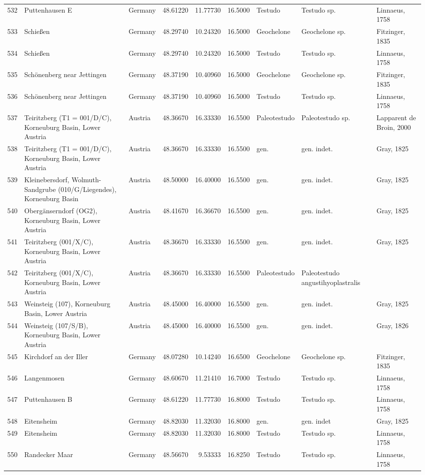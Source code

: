 \begin{landscape}
{\begin{longtable}[]{@{}lllrrrlll@{}}
532 & Puttenhausen E & Germany & 48.61220 & 11.77730 & 16.5000 & Testudo
& Testudo sp. & Linnaeus, 1758\tabularnewline
533 & Schießen & Germany & 48.29740 & 10.24320 & 16.5000 & Geochelone &
Geochelone sp. & Fitzinger, 1835\tabularnewline
534 & Schießen & Germany & 48.29740 & 10.24320 & 16.5000 & Testudo &
Testudo sp. & Linnaeus, 1758\tabularnewline
535 & Schönenberg near Jettingen & Germany & 48.37190 & 10.40960 &
16.5000 & Geochelone & Geochelone sp. & Fitzinger, 1835\tabularnewline
536 & Schönenberg near Jettingen & Germany & 48.37190 & 10.40960 &
16.5000 & Testudo & Testudo sp. & Linnaeus, 1758\tabularnewline
537 & Teiritzberg (T1 = 001/D/C), Korneuburg Basin, Lower Austria &
Austria & 48.36670 & 16.33330 & 16.5500 & Paleotestudo & Paleotestudo
sp. & Lapparent de Broin, 2000\tabularnewline
538 & Teiritzberg (T1 = 001/D/C), Korneuburg Basin, Lower Austria &
Austria & 48.36670 & 16.33330 & 16.5500 & gen. & gen. indet. & Gray,
1825\tabularnewline
539 & Kleinebersdorf, Wolmuth-Sandgrube (010/G/Liegendes), Korneuburg
Basin & Austria & 48.50000 & 16.40000 & 16.5500 & gen. &
gen. indet. & Gray, 1825\tabularnewline
540 & Obergänserndorf (OG2), Korneuburg Basin, Lower Austria & Austria &
48.41670 & 16.36670 & 16.5500 & gen. & gen. indet. & Gray,
1825\tabularnewline
541 & Teiritzberg (001/X/C), Korneuburg Basin, Lower Austria & Austria &
48.36670 & 16.33330 & 16.5500 & gen. & gen. indet. & Gray,
1825\tabularnewline
542 & Teiritzberg (001/X/C), Korneuburg Basin, Lower Austria & Austria &
48.36670 & 16.33330 & 16.5500 & Paleotestudo & Paleotestudo
angustihyoplastralis &\tabularnewline
543 & Weinsteig (107), Korneuburg Basin, Lower Austria & Austria &
48.45000 & 16.40000 & 16.5500 & gen. & gen. indet. & Gray,
1825\tabularnewline
544 & Weinsteig (107/S/B), Korneuburg Basin, Lower Austria & Austria &
48.45000 & 16.40000 & 16.5500 & gen. & gen. indet. & Gray,
1826\tabularnewline
545 & Kirchdorf an der Iller & Germany & 48.07280 & 10.14240 & 16.6500 &
Geochelone & Geochelone sp. & Fitzinger, 1835\tabularnewline
546 & Langenmosen & Germany & 48.60670 & 11.21410 & 16.7000 & Testudo &
Testudo sp. & Linnaeus, 1758\tabularnewline
547 & Puttenhausen B & Germany & 48.61220 & 11.77730 & 16.8000 & Testudo
& Testudo sp. & Linnaeus, 1758\tabularnewline
548 & Eitensheim & Germany & 48.82030 & 11.32030 & 16.8000 & gen. & gen.
indet & Gray, 1825\tabularnewline
549 & Eitensheim & Germany & 48.82030 & 11.32030 & 16.8000 & Testudo &
Testudo sp. & Linnaeus, 1758\tabularnewline
550 & Randecker Maar & Germany & 48.56670 & 9.53333 & 16.8250 & Testudo
& Testudo sp. & Linnaeus, 1758\tabularnewline

\end{longtable}}
\end{landscape}
